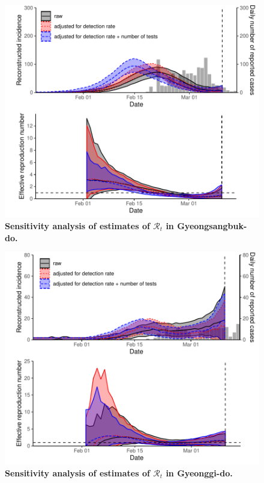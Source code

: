 \documentclass[12pt]{article}
\begin{document}
\pagebreak

\begin{figure}[!ht]
\includegraphics[width=\textwidth]{figure_R_t_gyeongbuk.pdf}
\caption{
\textbf{Sensitivity analysis of estimates of $\mathcal R_t$ in Gyeongsangbuk-do.}
}
\end{figure}

\pagebreak

\begin{figure}[!ht]
\includegraphics[width=\textwidth]{figure_R_t_gyeonggi.pdf}
\caption{
\textbf{Sensitivity analysis of estimates of $\mathcal R_t$ in Gyeonggi-do.}
}
\end{figure}
\end{document}
